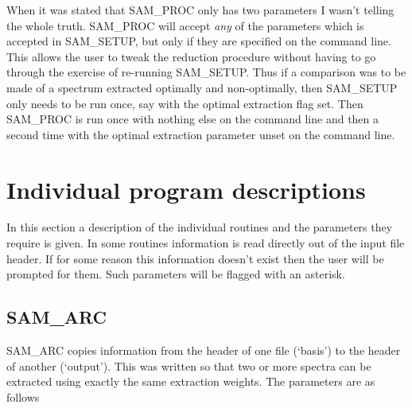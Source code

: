 When it was stated that SAM\_PROC only has two parameters I wasn't telling the
whole truth.  SAM\_PROC will accept {\em any} of the parameters which is
accepted in SAM\_SETUP, but only if they are specified on the command line. 
This allows the user to tweak the reduction procedure without having to go
through the exercise of re-running SAM\_SETUP.  Thus if a comparison was to be
made of a spectrum extracted optimally and non-optimally, then SAM\_SETUP only
needs to be run once, say with the optimal extraction flag set.  Then
SAM\_PROC is run once with nothing else on the command line and then a second
time with the optimal extraction parameter unset on the command line.

\section{Individual program descriptions} \label{sec:indiv}

In this section a description of the individual routines and the parameters
they require is given.  In some routines information is read directly out of
the input file header.  If for some reason this information doesn't exist then
the user will be prompted for them.  Such parameters will be flagged with an
asterisk.

\subsection{SAM\_ARC}

SAM\_ARC copies information from the header of one file (`basis') to the
header of another (`output').  This was written so that two or more spectra
can be extracted using exactly the same extraction weights.  The parameters
are  as follows

